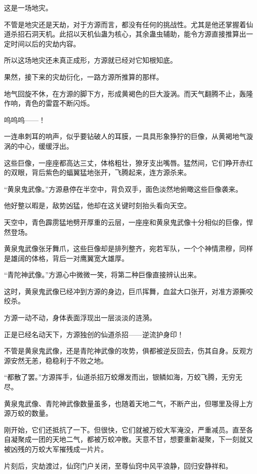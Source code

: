\begin{this_body}
这是一场地灾。

不管是地灾还是天劫，对于方源而言，都没有任何的挑战性。尤其是他还掌握着仙道杀招石洞天机。此招以天机仙蛊为核心，其余蛊虫辅助，能令方源直接推算出一定时间以后的灾劫内容。

所以这场地灾还未真正成形，方源就已经对它知根知底。

果然，接下来的灾劫衍化，一路方源所推算的那样。

地气回旋不休，在方源的脚下方，形成黄褐色的巨大漩涡。而天气翻腾不止，轰隆作响，青色的雷霆不断闪烁。

呜呜呜——！

一连串刺耳的响声，似乎要钻破人的耳膜，一具具形象狰狞的巨像，从黄褐地气漩涡的中心，缓缓浮出。

这些巨像，一座座都高达三丈，体格粗壮，獠牙支出嘴唇。猛然间，它们睁开赤红的双眼，背后紫色的蝠翼猛地张开，飞腾起来，连方源杀来。

“黄泉鬼武像。”方源悬停在半空中，背负双手，面色淡然地俯瞰这些巨像袭来。

他好整以暇是，敌势凶猛，他却在这关键时刻抬头看向天空。

天空中，青色霹雳猛地劈开厚重的云层，一座座和黄泉鬼武像十分相似的巨像，悍然登场。

黄泉鬼武像张牙舞爪，这些巨像却是排列整齐，宛若军队，一个个神情肃穆，同样是雄阔的体格，背后一对鹰翼宽大雄厚。

“青陀神武像。”方源心中微微一笑，将第二种巨像直接辨认出来。

这时，黄泉鬼武像已经冲到方源的身边，巨爪挥舞，血盆大口张开，对准方源撕咬绞杀。

方源一动不动，身体表面浮现出一层淡淡的涟漪。

正是已经名动天下，方源独创的仙道杀招——逆流护身印！

不管是黄泉鬼武像，还是青陀神武像的攻势，俱都被逆反回去，伤其自身。反观方源安然无恙，稳稳利于不败之地。

“都散了罢。”方源挥手，仙道杀招万蛟爆发而出，银鳞如海，万蛟飞腾，无穷无尽。

黄泉鬼武像、青陀神武像数量虽多，也随着天地二气，不断产出，但哪里及得上方源万蛟的数量。

刚开始，它们还抵抗了一下。但很快，它们就被万蛟大军淹没，严重减员。直至各自凝聚成一团的天地二气，都被万蛟冲散。天意不甘，想要重新凝聚，下一刻就又被凶残的万蛟大军摧残成一片片。

片刻后，灾劫渡过，仙窍门户关闭，至尊仙窍中风平浪静，回归安静祥和。


\end{this_body}
